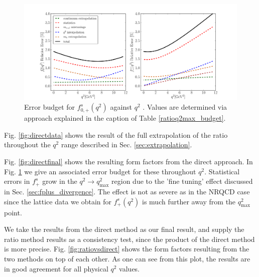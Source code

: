 \begin{figure}[htb!]
  \hspace{-85pt}
  \includegraphics[width=1.4\textwidth]{images/BsDs/direct/errorbudget.pdf}
  \caption{ Error budget for $f_{0,+}^s(q^2)$ against $q^2$ \label{fig:directerrorbudget}. Values are determined via approach explained in the caption of Table \ref{ratioq2max_budget}.}
\end{figure}

Fig. \ref{fig:directdata} shows the result of the full extrapolation of the ratio throughout the $q^2$ range described in Sec. \ref{sec:extrapolation}.

Fig. \ref{fig:directfinal} shows the resulting form factors from the direct approach. In Fig. \ref{fig:directerrorbudget} we give an associated error budget for these throughout $q^2$. Statistical errors in $f^s_+$ grow in the $q^2\to q^2_{\text{max}}$ region due to the 'fine tuning' effect discussed in Sec. \ref{sec:fplus_divergence}. The effect is not as severe as in the NRQCD case since the lattice data we obtain for $f^s_+(q^2)$ is much further away from the $q^2_{\text{max}}$ point.

We take the results from the direct method as our final result, and supply the ratio method results as a consistency test, since the product of the direct method is more precise. Fig. \ref{fig:ratiovsdirect} shows the form factors resulting from the two methods on top of each other. As one can see from this plot, the results are in good agreement for all physical $q^2$ values.

